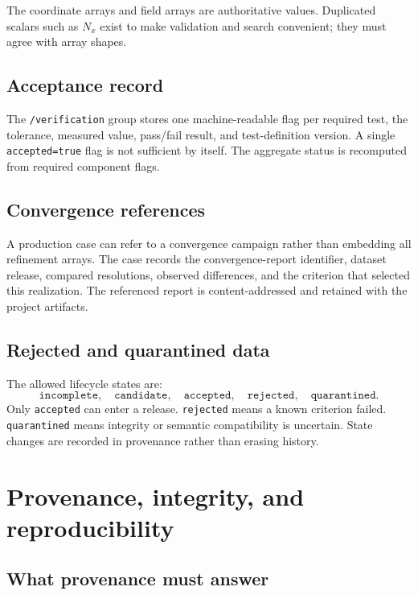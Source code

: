 \documentclass[11pt]{article}
\newcommand{\dataset}[1]{\texttt{/#1}}
\newcommand{\code}[1]{\texttt{#1}}
\begin{document}
The coordinate arrays and field arrays are authoritative values. Duplicated scalars such as $N_x$ exist to make validation and search convenient; they must agree with array shapes.

\subsection{Acceptance record}

The \dataset{verification} group stores one machine-readable flag per required test, the tolerance, measured value, pass/fail result, and test-definition version. A single \code{accepted=true} flag is not sufficient by itself. The aggregate status is recomputed from required component flags.

\subsection{Convergence references}

A production case can refer to a convergence campaign rather than embedding all refinement arrays. The case records the convergence-report identifier, dataset release, compared resolutions, observed differences, and the criterion that selected this realization. The referenced report is content-addressed and retained with the project artifacts.

\subsection{Rejected and quarantined data}

The allowed lifecycle states are:
\begin{equation}
\code{incomplete},\quad
\code{candidate},\quad
\code{accepted},\quad
\code{rejected},\quad
\code{quarantined}.
\end{equation}
Only \code{accepted} can enter a release. \code{rejected} means a known criterion failed. \code{quarantined} means integrity or semantic compatibility is uncertain. State changes are recorded in provenance rather than erasing history.

\section{Provenance, integrity, and reproducibility}
\label{sec:provenance}

\subsection{What provenance must answer}
\end{document}
